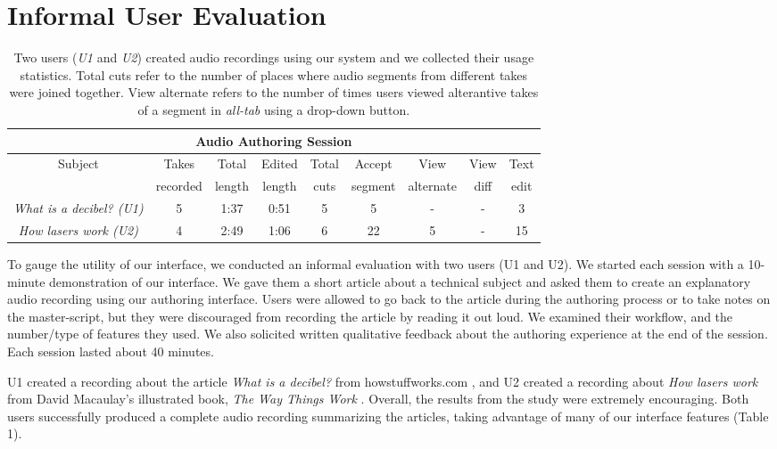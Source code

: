 \section{Informal User Evaluation}

\begin{table*}[ht]
\center
{}
\begin{tabular}{c|cccccccc}
\multicolumn{9}{c}{\textbf{Audio Authoring Session}}\\\hline
{Subject}&{Takes} &{Total}&{Edited} & {Total} & {Accept}
&{View}&{View}&{Text} \\
{}&{recorded}&{length}&{length}&{cuts}&{segment}&{alternate}&{diff}&{edit} \\\hline
\textit{What is a decibel? (U1)}&{5}&{1:37}&{0:51}& {5}&{5} &{-}&{-}&{3}\\
\textit{How lasers work (U2)}  &{4}&{2:49}&{1:06}&{6}&{22}&{5}&{-}&{15}
\\\hline
\end{tabular} 
\label{tab:recording}
\caption{Two users (\textit{U1} and \textit{U2}) created audio recordings using our system and we collected their usage statistics. Total cuts refer to the number of places where audio segments from different takes were joined together. View alternate refers to the number of times users viewed alterantive takes of a segment in  \textit{all-tab} using a drop-down button.}
\end{table*}

To gauge the utility of our interface, we conducted an informal evaluation with two users (U1 and U2). We started each session with a 10-minute demonstration of our interface. We gave them a short article about a technical subject and asked them to create an explanatory audio recording using our authoring interface. Users were allowed to go back to the article during the authoring process or to take notes on the master-script, but they were discouraged from recording the article by reading it out loud. We examined their workflow, and the number/type of features they used. We also solicited written qualitative feedback about the authoring experience at the end of the session. Each session lasted about 40 minutes.

U1 created a recording about the article \textit{What is a decibel? } from howstuffworks.com \cite{howstuffworks}, and U2 created a recording about \textit{How lasers work} from David Macaulay's illustrated book, \textit{The Way Things Work} \cite{macaulay1999way}. Overall, the results from the study were extremely encouraging. Both users successfully produced a complete audio recording summarizing the articles, taking advantage of many of our interface features (Table 1). 



